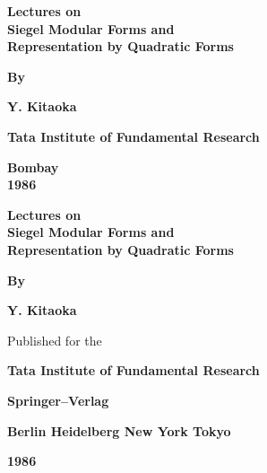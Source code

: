 \thispagestyle{empty}
\begin{center}
{\Large\bf Lectures on}\\[5pt]
{\Large\bf Siegel Modular Forms and}\\[5pt] 
{\Large\bf Representation by Quadratic Forms}
\vskip 1cm

{\bf By}\\
\medskip

{\large\bf Y. Kitaoka}
\vfill

{\bf Tata Institute of Fundamental Research}


{\bf Bombay}\\


{\bf 1986}
\end{center}
\eject

\thispagestyle{empty}

\begin{center}
{\Large\bf Lectures on}\\[5pt]
{\Large\bf Siegel Modular Forms and}\\[5pt] 
{\Large\bf Representation by Quadratic Forms}
\vskip 1cm

{\bf By}
\medskip

{\large\bf Y. Kitaoka}
\vfill

Published for the 
\medskip




{\bf Tata Institute of Fundamental Research}

{\bf Springer--Verlag}


{\bf Berlin Heidelberg New York Tokyo}

{\bf 1986}
\end{center}
\eject

